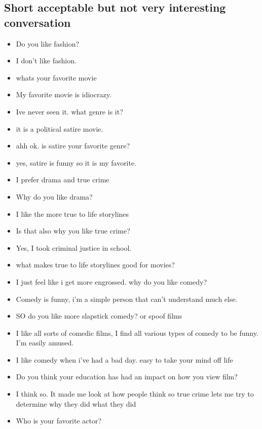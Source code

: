 \documentclass[11pt,a4paper]{article}
\begin{document}
\subsection{Short acceptable but not very interesting conversation}
\begin{itemize}
\itemsep0em
\item[\ding{172}] Do you like fashion?
\item[\ding{173}] I don't like fashion. 
\item[\ding{172}] whats your favorite movie 
\item[\ding{173}] My favorite movie is idiocrazy. 
\item[\ding{172}] Ive never seen it. what genre is it? 
\item[\ding{173}] it is a political satire movie. 
\item[\ding{172}] ahh ok. is satire your favorite genre? 
\item[\ding{173}] yes, satire is funny so it is my favorite. 
\item[\ding{172}] I prefer drama and true crime 
\item[\ding{173}] Why do you like drama?
\item[\ding{172}] I like the more true to life storylines 
\item[\ding{173}] Is that also why you like true crime? 
\item[\ding{172}] Yes, I took criminal justice in school. 
\item[\ding{173}] what makes true to life storylines good for movies? 
\item[\ding{172}] I just feel like i get more engrossed. why do you like comedy?
\item[\ding{173}] Comedy is funny, i'm a simple person that can't understand much else. 
\item[\ding{172}] SO do you like more slapstick comedy? or spoof films
\item[\ding{173}] I like all sorts of comedic films, I find all various types of comedy to be funny. I'm easily amused.
\item[\ding{172}] I like comedy when i've had a bad day. easy to take your mind off life 
\item[\ding{173}] Do you think your education has had an impact on how you view film?
\item[\ding{172}] I think so.  It made me look at how people think so true crime lets me try to determine why they did what they did 
\item[\ding{173}] Who is your favorite actor?

\end{itemize}
\end{document}
